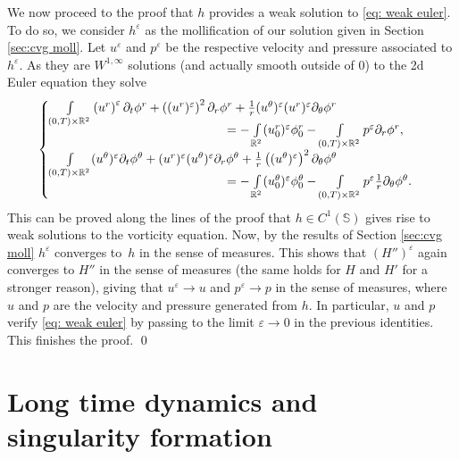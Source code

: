 \documentclass[10pt]{amsart}
\let\epsilon\varepsilon
\theoremstyle{plain}
\theoremstyle{definition}
\let\eps\epsilon
\newcommand{\bbS}{\mathbb S}
\begin{document}
We now proceed to the proof that $h$ provides a weak solution to \eqref{eq: weak euler}. To do so, we consider $h^\epsilon$ as the mollification of our solution given in Section \ref{sec:cvg moll}. Let $u^\epsilon$ and $p^\epsilon$ be the respective velocity and pressure associated to $h^\epsilon$. As they are $W^{1,\infty}$ solutions (and actually smooth outside of $0$) to the 2d Euler equation they solve
\[
\begin{cases} \int\limits_{(0,T)\times\mathbb{R}^2}\left(u^r \right)^\epsilon\partial_t\phi^r+\left((u^r)^\epsilon\right)^2 \partial_r \phi^r+\frac{1}{r}(u^\theta)^{\epsilon} (u^r)^{\epsilon} \partial_\theta \phi^r\\[-5pt]
\hspace*{5cm}=-\int\limits_{\mathbb{R}^2}(u^r_0)^{\epsilon}\phi^r_0-\int\limits_{(0,T)\times\mathbb{R}^2} p^\epsilon \partial_r \phi^r,\\
\int\limits_{(0,T)\times\mathbb{R}^2}(u^\theta)^{\epsilon} \partial_t\phi^\theta+(u^r)^{\epsilon} (u^\theta)^{\epsilon} \partial_r \phi^\theta+\frac{1}{r}\left((u^\theta)^{\epsilon}\right)^2 \partial_\theta \phi^\theta\\[-5pt]
\hspace*{5cm}=-\int\limits_{\mathbb{R}^2}(u^\theta_0)^\epsilon \phi^\theta_0-\int\limits_{(0,T)\times\mathbb{R}^2} p^\epsilon \frac{1}{r}\partial_\theta \phi^\theta.
\end{cases}
\]
This can be proved along the lines of the proof that $h \in C^1(\bbS)$ gives rise to weak solutions to the vorticity equation.
Now, by the results of Section \ref{sec:cvg moll} $h^\epsilon$ converges to~$h$ in the sense of measures. This shows that $(H'')^\epsilon$ again converges to $H''$ in the sense of measures (the same holds for $H$ and $H'$ for a stronger reason), giving that $u^\epsilon \to u$ and $p^\epsilon \to p$ in the sense of measures, where $u$ and $p$ are the velocity and pressure generated from $h$. In particular, $u$ and $p$ verify \eqref{eq: weak euler} by passing to the limit $\eps\to 0$ in the previous identities. This finishes the proof. \qed

\section{Long time dynamics and singularity formation}\label{sec:longtime}

\end{document}
